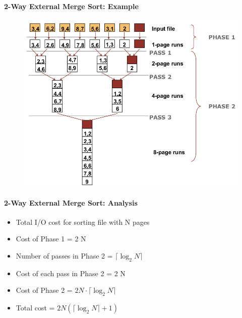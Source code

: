 \paragraph{2-Way External Merge Sort: Example}

\begin{figure}[h]
  \begin{minipage}{1.0\linewidth}
    \begin{center}
      \includegraphics[scale=0.18]{graphics/phase2-ex}
    \end{center}
  \end{minipage}
\end{figure}



\paragraph{2-Way External Merge Sort: Analysis}
\begin{itemize}
\item Total I/O cost for sorting file with N pages
\item Cost of Phase 1 = 2 N
\item Number of passes in Phase 2 = $\lceil \log_2 N \rceil$
\item Cost of each pass in Phase 2 = 2 N
\item Cost of Phase 2 = $2 N \cdot \lceil \log_2 N \rceil$
\item Total cost = $2N (\lceil \log_2 N \rceil + 1)$
\end{itemize}



